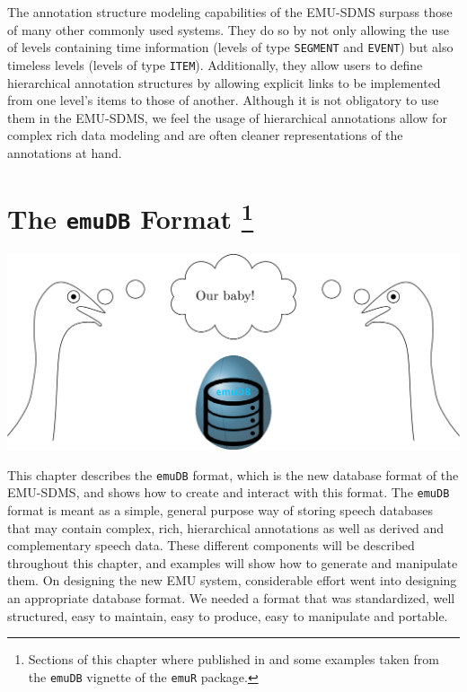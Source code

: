 \documentclass[]{book}
\let\rmarkdownfootnote\footnote%
\def\footnote{\protect\rmarkdownfootnote}
\theoremstyle{definition}
\theoremstyle{definition}
\theoremstyle{definition}
\theoremstyle{remark}
\begin{document}
The annotation structure modeling capabilities of the EMU-SDMS surpass
those of many other commonly used systems. They do so by not only
allowing the use of levels containing time information (levels of type
\texttt{SEGMENT} and \texttt{EVENT}) but also timeless levels (levels of
type \texttt{ITEM}). Additionally, they allow users to define
hierarchical annotation structures by allowing explicit links to be
implemented from one level's items to those of another. Although it is
not obligatory to use them in the EMU-SDMS, we feel the usage of
hierarchical annotations allow for complex rich data modeling and are
often cleaner representations of the annotations at hand.

\hypertarget{chap:emuDB}{%
\chapter[The \texttt{emuDB} Format ]{\texorpdfstring{The \texttt{emuDB}
Format \footnote{Sections of this chapter where published in
  \citet{winkelmann:2017aa} and some examples taken from the
  \texttt{emuDB} vignette of the \texttt{emuR} package.}}{The emuDB Format }}\label{chap:emuDB}}

\begin{center}\includegraphics[width=0.75\linewidth]{pics/EMU-webAppEmu_emuDB} \end{center}

This chapter describes the \texttt{emuDB} format, which is the new
database format of the EMU-SDMS, and shows how to create and interact
with this format. The \texttt{emuDB} format is meant as a simple,
general purpose way of storing speech databases that may contain
complex, rich, hierarchical annotations as well as derived and
complementary speech data. These different components will be described
throughout this chapter, and examples will show how to generate and
manipulate them. On designing the new EMU system, considerable effort
went into designing an appropriate database format. We needed a format
that was standardized, well structured, easy to maintain, easy to
produce, easy to manipulate and portable.
\end{document}
